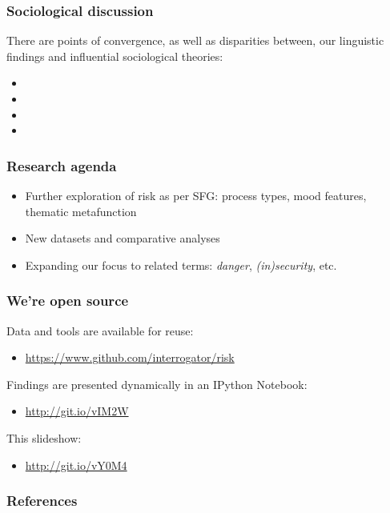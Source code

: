 \documentclass{beamer}       %
\begin{document}
\begin{frame}
    \frametitle{Sociological discussion}

    There are points of convergence, as well as disparities between, our linguistic findings and influential sociological theories:
    
    \begin{itemize}
    \item 
    \item 
    \item 
    \item 
    \end{itemize}

\end{frame}

\begin{frame}
    \frametitle{Research agenda}
    \begin{itemize}
        \item Further exploration of risk as per SFG: process types, mood features, thematic metafunction
        \item New datasets and comparative analyses
        \item Expanding our focus to related terms: \emph{danger}, \emph{(in)security}, etc.
    \end{itemize}
\end{frame}


\begin{frame}
    \frametitle{We're open source}

    Data and tools are available for reuse:
    \begin{itemize}
    \item \url{https://www.github.com/interrogator/risk}
    \end{itemize}
    Findings are presented dynamically in an IPython Notebook: 
    \begin{itemize}
    \item \url{http://git.io/vIM2W}
    \end{itemize}
    This slideshow:
    \begin{itemize}
    \item \url{http://git.io/vY0M4}
    \end{itemize}
\end{frame}








    \begin{frame}[t,allowframebreaks]
    \frametitle{References}
    
    
    \end{frame}
    
    
\end{document}
